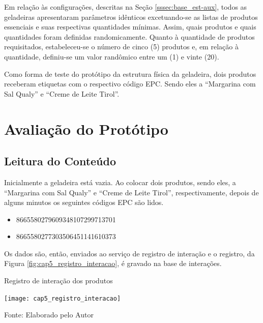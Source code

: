 Em relação às configurações, descritas na Seção \ref{sssec:base_est-aux}, todos as geladeiras apresentaram parâmetros idênticos excetuando-se as listas de produtos essenciais e suas respectivas quantidades mínimas. Assim, quais produtos e quais quantidades foram definidas randomicamente. Quanto à quantidade de produtos requisitados, estabeleceu-se o número de cinco (5) produtos e, em relação à quantidade, definiu-se um valor randômico entre um (1) e vinte (20).

Como forma de teste do protótipo da estrutura física da geladeira, dois produtos receberam etiquetas com o respectivo código EPC. Sendo eles a ``Margarina com Sal Qualy'' e ``Creme de Leite Tirol''.


\section{Avaliação do Protótipo}

\subsection{Leitura do Conteúdo}
 Inicialmente a geladeira está vazia.
 Ao colocar dois produtos, sendo eles, a ``Margarina com Sal Qualy'' e ``Creme de Leite Tirol'', respectivamente, depois de alguns minutos os seguintes códigos EPC são lidos.
 
 \begin{itemize} \parskip -3pt
     \item 8665580279609348107299713701
     \item 8665580277303506451141610373
 \end{itemize}
 
 Os dados são, então, enviados ao serviço de registro de interação e o registro, da Figura \ref{fig:cap5_registro_interacao}, é gravado na base de interações. 
 
 \begin{quadro}[htb]
     \caption{Registro de interação dos produtos}
     \label{fig:cap5_registro_interacao}
     
     \texttt{[image: cap5\_registro\_interacao]}
     
     \footnotesize{Fonte: Elaborado pelo Autor}
 \end{quadro}
 
